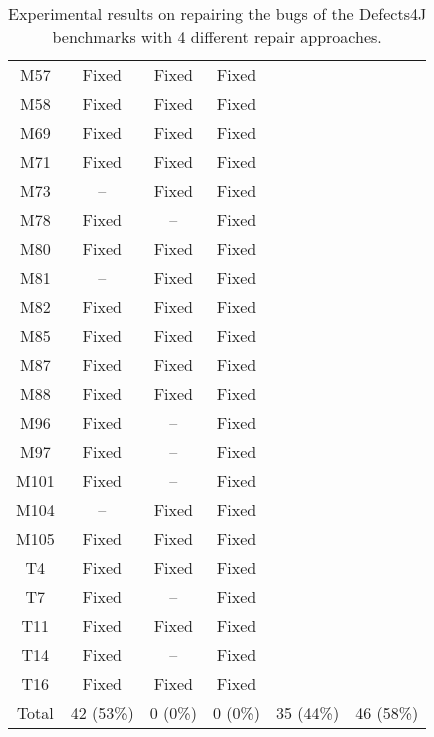\begin{table}[!t]
{\begin{tabular}{|c|c|c|c|c|c|}
M57               & Fixed     & Fixed     &Fixed   \\
M58               & Fixed     & Fixed     &Fixed   \\
M69               & Fixed     & Fixed     &Fixed   \\
M71               & Fixed     & Fixed     &Fixed   \\
M73               & --        & Fixed     &Fixed   \\
M78               & Fixed     & --        &Fixed   \\
M80               & Fixed     & Fixed     &Fixed   \\
M81               & --        & Fixed     &Fixed   \\
M82               & Fixed     & Fixed     &Fixed   \\
M85               & Fixed     & Fixed     &Fixed   \\
M87               & Fixed     & Fixed     &Fixed   \\
M88               & Fixed     & Fixed     &Fixed   \\
M96               & Fixed     & --        &Fixed   \\
M97               & Fixed     & --        &Fixed   \\
M101              & Fixed     & --        &Fixed   \\
M104              & --        & Fixed     &Fixed   \\
M105              & Fixed     & Fixed     &Fixed   \\
\hline
T4                & Fixed     & Fixed     &Fixed   \\
T7                & Fixed     & --        &Fixed   \\
T11               & Fixed     & Fixed     &Fixed   \\
T14               & Fixed     & --        &Fixed   \\
T16               & Fixed     & Fixed     &Fixed   \\
\hline
Total             & 42 (53\%) & 0 (0\%)   & 0 (0\%)   & 35 (44\%) & 46 (58\%)\\
\hline 
\end{tabular}%
}
\caption{Experimental results on repairing the bugs of the Defects4J benchmarks with 4 different repair approaches.}
\end{table}
